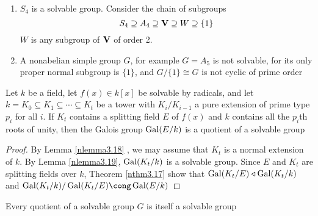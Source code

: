 \documentclass[11pt]{article}
\begin{document}
\begin{examplle}[]
\label{nexample3.20}
\begin{enumerate}
\item \(S_4\) is a solvable group. Consider the chain of subgroups
\begin{equation*}
S_4\supseteq A_4\supseteq \operatorname{\textbf{V}}\supseteq W\supseteq\{1\}
\end{equation*}
\(W\) is any subgroup of \(\operatorname{\textbf{V}}\) of order 2.
\item A nonabelian simple group \(G\), for example \(G=A_5\) is not solvable, for its
only proper normal subgroup is \(\{1\}\), and \(G/\{1\}\cong G\) is not
cyclic of prime order
\end{enumerate}
\end{examplle}

\begin{lemma}[]
\label{nlemma3.21}
Let \(k\) be a field, let \(f(x)\in k[x]\) be solvable by radicals, and let 
\(k=K_0\subseteq K_1\subseteq\cdots\subseteq K_t\) be a tower with
\(K_i/K_{i-1}\) a pure extension of prime type \(p_i\) for all \(i\). If \(K_t\)
contains a splitting field \(E\) of \(f(x)\) and \(k\) contains all the
\(p_i\)th roots of unity, then the Galois group \(\operatorname{Gal}(E/k)\) is a quotient
of a solvable group
\end{lemma}

\begin{proof}
By Lemma \ref{nlemma3.18} , we may assume that \(K_t\) is a normal extension
of \(k\). By Lemma \ref{nlemma3.19}, \(\operatorname{Gal}(K_t/k)\) is a solvable group. Since
\(E\) and \(K_t\) are splitting fields over \(k\), Theorem \ref{nthm3.17} show
that \(\operatorname{Gal}(K_t/E)\triangleleft\operatorname{Gal}(K_t/k)\) and
\(\Gal(K_t/k)/\Gal(K_t/E)\cong\Gal(E/k)\)
\end{proof}

\begin{proposition}[]
\label{nprop3.22}
Every quotient of a solvable group \(G\) is itself a solvable group
\end{proposition}
\end{document}
